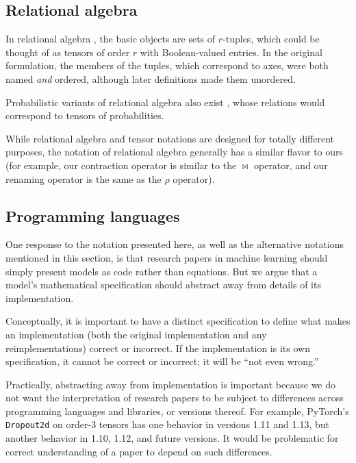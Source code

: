 \subsection{Relational algebra}

In relational algebra \citep{codd:1970}, the basic objects are sets of $r$-tuples, which could be thought of as tensors of order $r$ with Boolean-valued entries. In the original formulation, the members of the tuples, which correspond to axes, were both named \emph{and} ordered, although later definitions \citep[e.g.][]{pirotte:1982} made them unordered.

Probabilistic variants of relational algebra also exist \citep[e.g.][]{dey+sarkar:1996,fuhr+rolleke:1997}, whose relations would correspond to tensors of probabilities.

While relational algebra and tensor notations are designed for totally different purposes, the notation of relational algebra generally has a similar flavor to ours (for example, our contraction operator is similar to the $\bowtie$ operator, and our renaming operator is the same as the $\rho$ operator).

\subsection{Programming languages}

One response to the notation presented here, as well as the alternative notations mentioned in this section, is that research papers in machine learning should simply present models as code rather than equations.
But we argue that a model's mathematical specification should abstract away from details of its implementation.

Conceptually, it is important to have a distinct specification to define what makes an implementation (both the original implementation and any reimplementations) correct or incorrect.
If the implementation is its own specification, it cannot be correct or incorrect; it will be ``not even wrong.''

Practically, abstracting away from implementation is important because we do not want the interpretation of research papers to be subject to differences across programming languages and libraries, or versions thereof.
For example, PyTorch's \verb|Dropout2d| on order-3 tensors has one behavior in versions 1.11 and 1.13, but another behavior in 1.10, 1.12, and future versions.
It would be problematic for correct understanding of a paper to depend on such differences.
